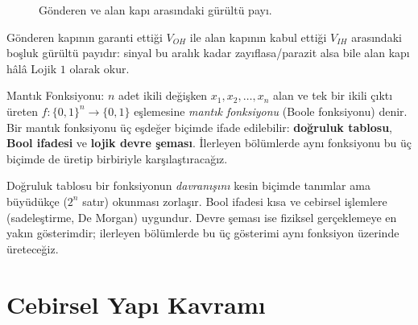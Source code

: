 \begin{figure}[H]
\centering
{}
\caption{Gönderen ve alan kapı arasındaki gürültü payı.}
\label{fig:gurultu-payi-gorsel}
\end{figure}

Gönderen kapının garanti ettiği $V_{OH}$ ile alan kapının kabul ettiği $V_{IH}$ arasındaki
boşluk gürültü payıdır: sinyal bu aralık kadar zayıflasa/parazit alsa bile alan kapı hâlâ
Lojik $1$ olarak okur.

\begin{tanim}{Mantık Fonksiyonu:}
$n$ adet ikili değişken $x_1, x_2, \ldots, x_n$ alan ve tek bir ikili çıktı üreten
$f: \{0,1\}^n \to \{0,1\}$ eşlemesine \emph{mantık fonksiyonu}
(Boole fonksiyonu) denir. Bir mantık fonksiyonu üç eşdeğer biçimde ifade edilebilir:
\textbf{doğruluk tablosu}, \textbf{Bool ifadesi} ve \textbf{lojik devre şeması}. İlerleyen
bölümlerde aynı fonksiyonu bu üç biçimde de üretip birbiriyle karşılaştıracağız.
\end{tanim}

\begin{bilginot}
Doğruluk tablosu bir fonksiyonun \emph{davranışını} kesin biçimde tanımlar ama büyüdükçe
($2^n$ satır) okunması zorlaşır. Bool ifadesi kısa ve cebirsel işlemlere (sadeleştirme,
De Morgan) uygundur. Devre şeması ise fiziksel gerçeklemeye en yakın gösterimdir; ilerleyen
bölümlerde bu üç gösterimi aynı fonksiyon üzerinde üreteceğiz.
\end{bilginot}

\section{Cebirsel Yapı Kavramı}
\label{sec:cebirsel-yapi}

